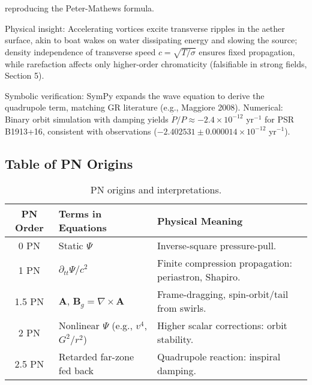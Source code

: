 reproducing the Peter-Mathews formula.

Physical insight: Accelerating vortices excite transverse ripples in the aether surface, akin to boat wakes on water dissipating energy and slowing the source; density independence of transverse speed $c = \sqrt{T / \sigma}$ ensures fixed propagation, while rarefaction affects only higher-order chromaticity (falsifiable in strong fields, Section 5).

Symbolic verification: SymPy expands the wave equation to derive the quadrupole term, matching GR literature (e.g., Maggiore 2008). Numerical: Binary orbit simulation with damping yields $\dot{P}/P \approx -2.4 \times 10^{-12}$ yr$^{-1}$ for PSR B1913+16, consistent with observations ($-2.402531 \pm 0.000014 \times 10^{-12}$ yr$^{-1}$).

\medskip
\noindent
{}
\medskip

\subsection{Table of PN Origins}

\begin{table}[h!]
\centering
\begin{tabular}{|c|l|l|}
\hline
PN Order & Terms in Equations & Physical Meaning \\
\hline
0 PN & Static $\Psi$ & Inverse-square pressure-pull. \\
1 PN & $\partial_{tt} \Psi / c^2$ & Finite compression propagation: periastron, Shapiro. \\
1.5 PN & $\mathbf{A}$, $\mathbf{B}_g = \nabla \times \mathbf{A}$ & Frame-dragging, spin-orbit/tail from swirls. \\
2 PN & Nonlinear $\Psi$ (e.g., $v^4$, $G^2 / r^2$) & Higher scalar corrections: orbit stability. \\
2.5 PN & Retarded far-zone fed back & Quadrupole reaction: inspiral damping. \\
\hline
\end{tabular}
\caption{PN origins and interpretations.}
\end{table}

